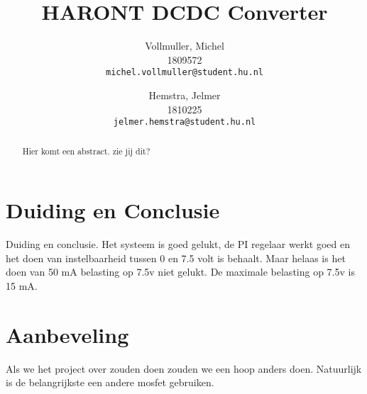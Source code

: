 \documentclass{article}
\title{HARONT DCDC Converter}
\author{
  Vollmuller, Michel\\
  1809572\\
  \texttt{michel.vollmuller@student.hu.nl}
  \and
  Hemstra, Jelmer\\
  1810225\\
  \texttt{jelmer.hemstra@student.hu.nl}
}
\begin{document}
\maketitle

\begin{abstract}
    Hier komt een abstract. zie jij dit?
\end{abstract}










\section{Duiding en Conclusie}
Duiding en conclusie.
Het systeem is goed gelukt, de PI regelaar werkt goed en het doen van instelbaarheid tussen 0 en 7.5 volt is behaalt. 
Maar helaas is het doen van 50 mA belasting op 7.5v niet gelukt. 
De maximale belasting op 7.5v is 15 mA. 

\section{Aanbeveling}
Als we het project over zouden doen zouden we een hoop anders doen. 
Natuurlijk is de belangrijkste een andere mosfet gebruiken. 



\appendix
\end{document}

